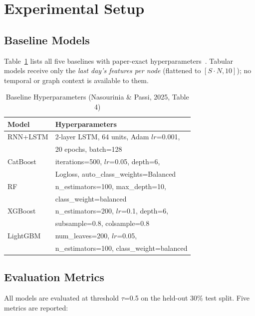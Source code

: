 \documentclass[conference]{IEEEtran}
\begin{document}
\section{Experimental Setup}
\label{sec:exp}

\subsection{Baseline Models}

Table~\ref{tab:baselines} lists all five baselines with paper-exact
hyperparameters~\cite{nasourinia2025}. Tabular models receive only the
\emph{last day's features per node} (flattened to $[S{\cdot}N, 10]$);
no temporal or graph context is available to them.

\begin{table}[H]
\caption{Baseline Hyperparameters (Nasourinia \& Passi, 2025, Table 4)}
\label{tab:baselines}
\centering
\renewcommand{\arraystretch}{1.1}
\begin{tabular}{lp{5.0cm}}
\toprule
\textbf{Model} & \textbf{Hyperparameters} \\
\midrule
RNN+LSTM   & 2-layer LSTM, 64 units, Adam $lr$=0.001,\\
           & 20 epochs, batch=128 \\[2pt]
CatBoost   & iterations=500, $lr$=0.05, depth=6,\\
           & Logloss, auto\_class\_weights=Balanced \\[2pt]
RF         & n\_estimators=100, max\_depth=10,\\
           & class\_weight=balanced \\[2pt]
XGBoost    & n\_estimators=200, $lr$=0.1, depth=6,\\
           & subsample=0.8, colsample=0.8 \\[2pt]
LightGBM   & num\_leaves=200, $lr$=0.05,\\
           & n\_estimators=100, class\_weight=balanced \\
\bottomrule
\end{tabular}
\end{table}

\subsection{Evaluation Metrics}

All models are evaluated at threshold $\tau$=0.5 on the held-out 30\% test
split. Five metrics are reported:
\end{document}
